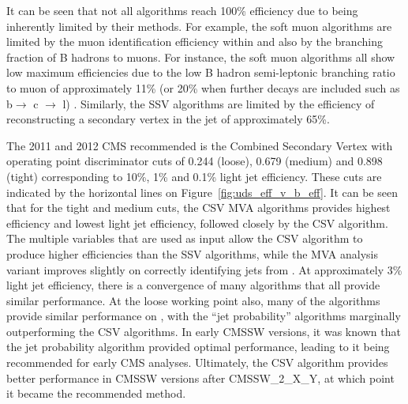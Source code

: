 It can be seen that not all algorithms reach 100\% \bjet efficiency due to being inherently limited by their
methods. For example, the soft muon algorithms are limited by the muon identification efficiency within \bjets
and also by the branching fraction of B hadrons to muons. For instance, the soft muon algorithms all show low
maximum \bjet efficiencies due to the low B hadron semi-leptonic branching ratio to muon of approximately 11\%
(or 20\% when further decays are included such as b$\rightarrow$ c $\rightarrow$ l) \cite{Ferro:2012tg}.
Similarly, the SSV algorithms are limited by the efficiency of reconstructing a secondary vertex in the jet of
approximately 65\%.

The 2011 and 2012 CMS recommended \btagger is the Combined Secondary Vertex with operating point discriminator
cuts of 0.244 (loose), 0.679 (medium) and 0.898 (tight) corresponding to 10\%, 1\% and 0.1\% light jet
efficiency. These cuts are indicated by the horizontal lines on Figure~\ref{fig:uds_eff_v_b_eff}. It can be
seen that for the tight and medium cuts, the CSV MVA algorithms provides highest \bjet efficiency and lowest
light jet efficiency, followed closely by the CSV algorithm. The multiple variables that are used as input
allow the CSV algorithm to produce higher efficiencies than the SSV algorithms, while the MVA analysis variant
improves slightly on correctly identifying jets from \bquarks. At approximately 3\% light jet efficiency,
there is a convergence of many algorithms that all provide similar performance. At the loose working point
also, many of the algorithms provide similar performance on \bjets, with the ``jet probability'' algorithms
marginally outperforming the CSV algorithms. In early CMSSW versions, it was known that the jet
probability algorithm provided optimal performance, leading to it being recommended for early CMS
analyses. Ultimately, the CSV algorithm provides better performance in CMSSW versions after
CMSSW\_2\_X\_Y, at which point it became the recommended \btagging method.
